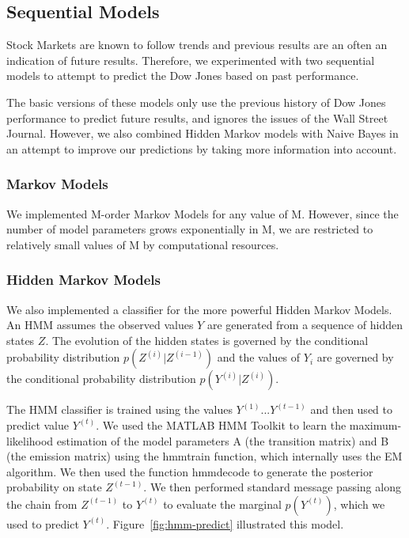 \documentclass[10pt, twocolumn]{article}
\def\TODO#1{\noindent\textbf{[TODO:} #1]}
\begin{document}
\subsection{Sequential Models}
\label{sec:sequential-models}

Stock Markets are known to follow trends and previous results are an often an indication of future results.
Therefore, we experimented with two sequential models to attempt to predict the Dow Jones based on past performance.

The basic versions of these models only use the previous history of Dow Jones performance to predict future results, and ignores the issues of the Wall Street Journal.
However, we also combined Hidden Markov models with Naive Bayes in an attempt to improve our predictions by taking more information into account.

\subsubsection*{Markov Models}
\label{sec:mm}

We implemented M-order Markov Models for any value of M. However, since the number of model parameters grows exponentially in M, we are restricted to relatively small values of M by computational resources.

\subsubsection*{Hidden Markov Models}
\label{sec:hmm}

We also implemented a classifier for the more powerful Hidden Markov Models. An HMM assumes the observed values $Y$ are generated from a sequence of hidden states $Z$.
The evolution of the hidden states is governed by the conditional probability distribution $p(Z^{(i)}|Z^{(i-1)})$ and the values of $Y_{i}$ are governed by the conditional probability distribution $p(Y^{(i)}|Z^{(i)})$.

The HMM classifier is trained using the values $Y^{(1)}...Y^{(t-1)}$ and then used to predict value $Y^{(t)}$.
We used the MATLAB HMM Toolkit to learn the maximum-likelihood estimation of the model parameters A (the transition matrix) and B (the emission matrix) using the hmmtrain function, which internally uses the EM algorithm.
We then used the function hmmdecode to generate the posterior probability on state $Z^{(t-1)}$.
We then performed standard message passing along the chain from $Z^{(t-1)}$ to $Y^{(t)}$ to evaluate the marginal $p(Y^{(t)})$, which we used to predict $Y^{(t)}$.
Figure~\ref{fig:hmm-predict} illustrated this model.
\end{document}
